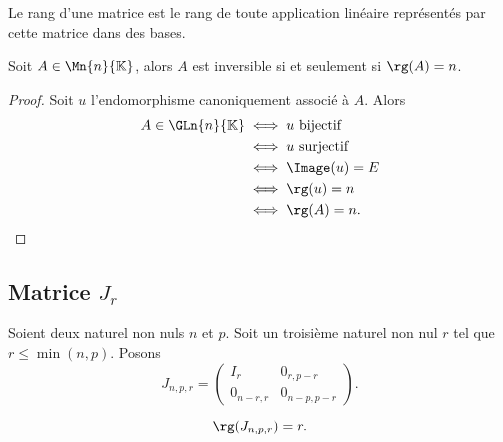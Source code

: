 \begin{corth}
  Le rang d'une matrice est le rang de toute application linéaire représentés par cette matrice dans des bases.
\end{corth}

\begin{corth}
  Soit $A \in \Mn{n}{\K}$, alors $A$ est inversible si et seulement si $\rg(A)=n$.
\end{corth}
\begin{proof}
  Soit $u$ l'endomorphisme canoniquement associé à $A$. Alors
  \begin{align}
    A \in \GLn{n}{\K} &\iff u \text{~bijectif}\\
    &\iff u \text{~surjectif}\\
    &\iff \Image(u)=E\\
    &\iff \rg(u) = n\\
    &\iff \rg(A) = n.
  \end{align}
\end{proof}

\subsection{Matrice $J_r$}

Soient deux naturel non nuls $n$ et $p$. Soit un troisième naturel non nul $r$ tel que $r \leq \min(n,p)$. Posons
\begin{equation}
  J_{n,p,r}=
  \begin{pmatrix}
    I_r & 0_{r,p-r} \\ 0_{n-r,r} & 0_{n-p,p-r}
  \end{pmatrix}.
\end{equation}

\begin{prop}
  \begin{equation}
    \rg(J_{n,p,r})=r.
  \end{equation}
\end{prop}

